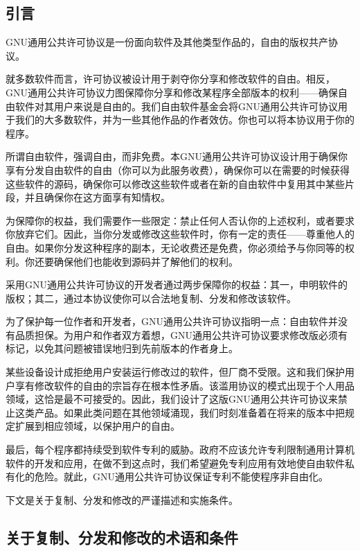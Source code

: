 \subsection{引言}
GNU通用公共许可协议是一份面向软件及其他类型作品的，自由的版权共产协议。\par
就多数软件而言，许可协议被设计用于剥夺你分享和修改软件的自由。相反，GNU通用公共许可协议力图保障你分享和修改某程序全部版本的权利——确保自由软件对其用户来说是自由的。我们自由软件基金会将GNU通用公共许可协议用于我们的大多数软件，并为一些其他作品的作者效仿。你也可以将本协议用于你的程序。\par
所谓自由软件，强调自由，而非免费。本GNU通用公共许可协议设计用于确保你享有分发自由软件的自由（你可以为此服务收费），确保你可以在需要的时候获得这些软件的源码，确保你可以修改这些软件或者在新的自由软件中复用其中某些片段，并且确保你在这方面享有知情权。\par
为保障你的权益，我们需要作一些限定：禁止任何人否认你的上述权利，或者要求你放弃它们。因此，当你分发或修改这些软件时，你有一定的责任——尊重他人的自由。如果你分发这种程序的副本，无论收费还是免费，你必须给予与你同等的权利。你还要确保他们也能收到源码并了解他们的权利。\par
采用GNU通用公共许可协议的开发者通过两步保障你的权益：其一，申明软件的版权；其二，通过本协议使你可以合法地复制、分发和修改该软件。\par
为了保护每一位作者和开发者，GNU通用公共许可协议指明一点：自由软件并没有品质担保。为用户和作者双方着想，GNU通用公共许可协议要求修改版必须有标记，以免其问题被错误地归到先前版本的作者身上。\par
某些设备设计成拒绝用户安装运行修改过的软件，但厂商不受限。这和我们保护用户享有修改软件的自由的宗旨存在根本性矛盾。该滥用协议的模式出现于个人用品领域，这恰是最不可接受的。因此，我们设计了这版GNU通用公共许可协议来禁止这类产品。如果此类问题在其他领域涌现，我们时刻准备着在将来的版本中把规定扩展到相应领域，以保护用户的自由。\par
最后，每个程序都持续受到软件专利的威胁。政府不应该允许专利限制通用计算机软件的开发和应用，在做不到这点时，我们希望避免专利应用有效地使自由软件私有化的危险。就此，GNU通用公共许可协议保证专利不能使程序非自由化。\par
下文是关于复制、分发和修改的严谨描述和实施条件。
\subsection{关于复制、分发和修改的术语和条件}
